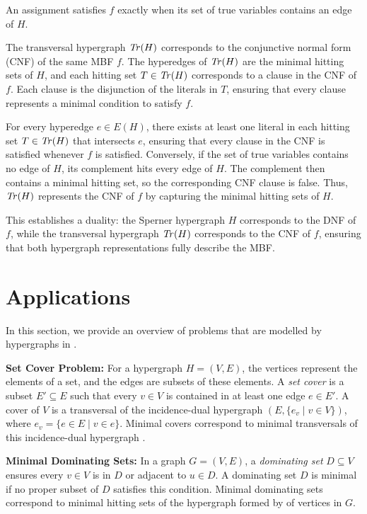 An assignment satisfies $f$ exactly when its set of true variables contains an edge of $H$.

The transversal hypergraph $\mathit{Tr}(H)$ corresponds to the conjunctive normal form (CNF) of the same MBF $f$. The hyperedges of $\mathit{Tr}(H)$ are the minimal hitting sets of $H$, and each hitting set $T\in\mathit{Tr}(H)$ corresponds to a clause in the CNF of $f$. Each clause is the disjunction of the literals in $T$, ensuring that every clause represents a minimal condition to satisfy $f$.

For every hyperedge $e\in E(H)$, there exists at least one literal in each hitting set $T\in\mathit{Tr}(H)$ that intersects $e$, ensuring that every clause in the CNF is satisfied whenever $f$ is satisfied. Conversely, if the set of true variables contains no edge of $H$, its complement hits every edge of $H$. The complement then contains a minimal hitting set, so the corresponding CNF clause is false. Thus, $\mathit{Tr}(H)$ represents the CNF of $f$ by capturing the minimal hitting sets of $H$.

This establishes a duality: the Sperner hypergraph $H$ corresponds to the DNF of $f$, while the transversal hypergraph $\mathit{Tr}(H)$ corresponds to the CNF of $f$, ensuring that both hypergraph representations fully describe the MBF.

\section{Applications}

In this section, we provide an overview of problems that are modelled by hypergraphs in \TransHyp.

\textbf{Set Cover Problem:} For a hypergraph $H=(V,E)$, the vertices represent the elements of a set, and the edges are subsets of these elements. A \emph{set cover} is a subset $E'\subseteq E$ such that every $v\in V$ is contained in at least one edge $e\in E'$. A cover of $V$ is a transversal of the incidence-dual hypergraph $(E,\{e_v\mid v\in V\})$, where $e_v=\{e\in E\mid v\in e\}$. Minimal covers correspond to minimal transversals of this incidence-dual hypergraph \cite{EMG08}.

\textbf{Minimal Dominating Sets:} In a graph $G=(V,E)$, a \emph{dominating set} $D\subseteq V$ ensures every $v\in V$ is in $D$ or adjacent to $u\in D$. A dominating set $D$ is minimal if no proper subset of $D$ satisfies this condition. Minimal dominating sets correspond to minimal hitting sets of the hypergraph formed by   of vertices in $G$.


